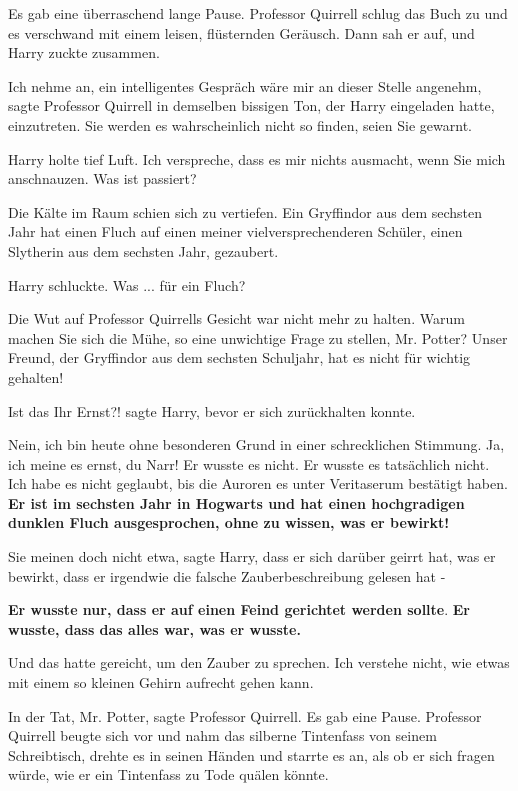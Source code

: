 Es gab eine überraschend lange Pause. Professor Quirrell schlug das Buch zu und
es verschwand mit einem leisen, flüsternden Geräusch. Dann sah er auf, und Harry
zuckte zusammen.

\glqq Ich nehme an, ein intelligentes Gespräch wäre mir an dieser Stelle
angenehm\grqq{}, sagte Professor Quirrell in demselben bissigen Ton, der Harry
eingeladen hatte, einzutreten. \glqq Sie werden es wahrscheinlich nicht so
finden, seien Sie gewarnt.\grqq{}

Harry holte tief Luft. \glqq Ich verspreche, dass es mir nichts ausmacht, wenn
Sie mich anschnauzen. Was ist passiert?\grqq{}

Die Kälte im Raum schien sich zu vertiefen. \glqq Ein Gryffindor aus dem
sechsten Jahr hat einen Fluch auf einen meiner vielversprechenderen Schüler,
einen Slytherin aus dem sechsten Jahr, gezaubert.\grqq{}

Harry schluckte. \glqq Was ... für ein Fluch?\grqq{}

Die Wut auf Professor Quirrells Gesicht war nicht mehr zu halten. \glqq Warum
machen Sie sich die Mühe, so eine unwichtige Frage zu stellen, Mr. Potter? Unser
Freund, der Gryffindor aus dem sechsten Schuljahr, hat es nicht für wichtig
gehalten!\grqq{}

\glqq Ist das Ihr Ernst?!\grqq{} sagte Harry, bevor er sich zurückhalten konnte.

\glqq Nein, ich bin heute ohne besonderen Grund in einer schrecklichen Stimmung.
Ja, ich meine es ernst, du Narr! Er wusste es nicht. Er wusste es tatsächlich
nicht. Ich habe es nicht geglaubt, bis die Auroren es unter Veritaserum
bestätigt haben. \textbf{Er ist im sechsten Jahr in Hogwarts und hat einen
hochgradigen dunklen Fluch ausgesprochen, ohne zu wissen, was er
bewirkt!}\grqq{}

\glqq Sie meinen doch nicht etwa\grqq{}, sagte Harry, \glqq dass er sich darüber
geirrt hat, was er bewirkt, dass er irgendwie die falsche Zauberbeschreibung
gelesen hat -\grqq{}

\glqq \textbf{Er wusste nur, dass er auf einen Feind gerichtet werden
sollte}.\textbf{ Er wusste, dass das alles war, was er wusste.}\grqq{}

Und das hatte gereicht, um den Zauber zu sprechen. \glqq Ich verstehe nicht, wie
etwas mit einem so kleinen Gehirn aufrecht gehen kann.\grqq{}

\glqq In der Tat, Mr. Potter\grqq{}, sagte Professor Quirrell. Es gab eine
Pause. Professor Quirrell beugte sich vor und nahm das silberne Tintenfass von
seinem Schreibtisch, drehte es in seinen Händen und starrte es an, als ob er
sich fragen würde, wie er ein Tintenfass zu Tode quälen könnte.

